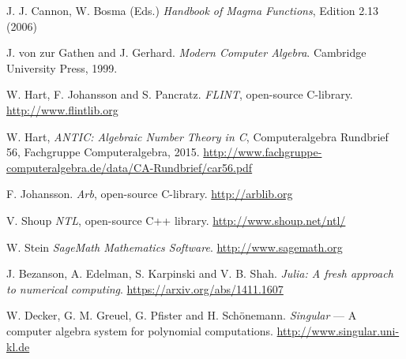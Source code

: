 \documentclass{sig-alternate-05-2015}
\begin{document}
\begin{thebibliography}{99}
J. J. Cannon, W. Bosma (Eds.) {\em Handbook of Magma Functions}, Edition 2.13 (2006)

J. von zur Gathen and J. Gerhard. {\em Modern Computer Algebra}. Cambridge University Press, 1999.

W. Hart, F. Johansson and S. Pancratz. {\em FLINT}, open-source C-library. \url{http://www.flintlib.org}

W. Hart, {\em ANTIC: Algebraic Number Theory in C}, Computeralgebra Rundbrief 56, Fachgruppe Computeralgebra, 2015. \url{http://www.fachgruppe-computeralgebra.de/data/CA-Rundbrief/car56.pdf}

F. Johansson. {\em Arb}, open-source C-library. \url{http://arblib.org}

V. Shoup {\em NTL}, open-source C++ library. \url{http://www.shoup.net/ntl/}

W. Stein {\em SageMath Mathematics Software}.  \url{http://www.sagemath.org}

 J. Bezanson, A. Edelman, S. Karpinski and V. B. Shah. {\em Julia: A fresh approach to numerical computing}. \url{https://arxiv.org/abs/1411.1607}

 W. Decker, G. M. Greuel, G. Pfister and H. Sch\"onemann. {\em Singular} --- A computer algebra system for polynomial computations. \url{http://www.singular.uni-kl.de}

%
%
\end{thebibliography}
\end{document}
